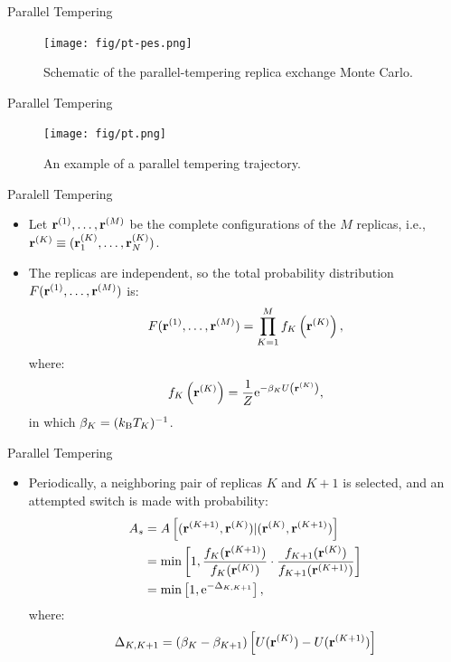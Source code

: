 \documentclass[10pt]{beamer}
\begin{document}
\begin{frame}{Parallel Tempering}
\begin{figure}
  \texttt{[image: fig/pt-pes.png]}
  \caption{Schematic of the parallel-tempering replica exchange Monte Carlo.}
\end{figure}
\end{frame}

\begin{frame}{Parallel Tempering}
\begin{figure}
  \texttt{[image: fig/pt.png]}
  \caption{An example of a parallel tempering trajectory.}
\end{figure}
\end{frame}

\begin{frame}{Paralell Tempering}
\begin{itemize}
\setlength\itemsep{1em}
  \item Let ${\bf r}^{(1)}, \dots, {\bf r}^{(M)}$ be the complete configurations of the $M$ replicas, i.e., ${\bf r}^{(K)} \equiv ({\bf r}_1^{(K)}, \dots, {\bf r}_N^{(K)})$.

  \item The replicas are independent, so the total probability distribution $F({\bf r}^{(1)}, \dots, {\bf r}^{(M)})$ is:
  \begin{equation}
    F({\bf r}^{(1)}, \dots, {\bf r}^{(M)}) = \prod_{K=1}^{M} f_K\left( {\bf r}^{(K)} \right),
  \end{equation}
  where:
  \begin{equation}
    f_K\left( {\bf r}^{(K)} \right) = \frac{1}{Z} \mathrm{e}^{-\beta_K U\left( {\bf r}^{(K)} \right)},
  \end{equation}
  in which $\beta_K = (k_\mathrm{B}T_K)^{-1}$.
\end{itemize}
\end{frame}

\begin{frame}{Parallel Tempering}
\begin{itemize}
\setlength\itemsep{1em}
  \item Periodically, a neighboring pair of replicas $K$ and $K+1$ is selected, and an attempted switch is made with probability:
  \begin{align}
    A_s &= A\left[ ({\bf r}^{(K+1)}, {\bf r}^{(K)}) | ({\bf r}^{(K)}, {\bf r}^{(K+1)}) \right] \\
        &= \min\left[ 1, \frac{f_K({\bf r}^{(K+1)})}{f_K({\bf r}^{(K)})} \cdot \frac{f_{K+1}({\bf r}^{(K)})}{f_{K+1}({\bf r}^{(K+1)})} \right] \\
    &= \min\left[ 1, \mathrm{e}^{-\Delta_{K,K+1}} \right],
  \end{align}
  where:
  \begin{equation}
    \Delta_{K,K+1} = (\beta_K - \beta_{K+1}) \left[ U({\bf r}^{(K)}) - U({\bf r}^{(K+1)}) \right]
  \end{equation}
\end{itemize}
\end{frame}
\end{document}
